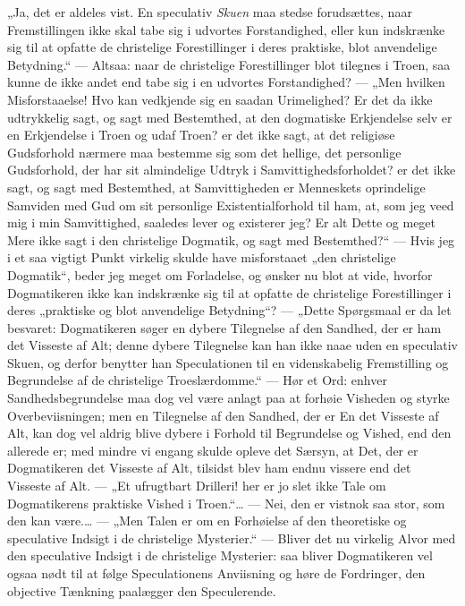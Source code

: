 „Ja, det er aldeles vist. En speculativ \emph{Skuen} maa stedse
forudsættes, naar Fremstillingen ikke skal tabe sig i udvortes
Forstandighed, eller kun indskrænke sig til at opfatte de
christelige Forestillinger i deres praktiske, blot anvendelige
Betydning.“ --- Altsaa: naar de christelige Forestillinger blot
tilegnes i Troen, saa kunne de ikke andet end tabe sig i en
udvortes Forstandighed?
 --- „Men hvilken Misforstaaelse! Hvo kan vedkjende sig en saadan
Urimelighed? Er det da ikke udtrykkelig sagt, og sagt med
Bestemthed, at den dogmatiske Erkjendelse selv er en Erkjendelse i
Troen og udaf Troen? er det ikke sagt, at det religiøse
Gudsforhold nærmere maa bestemme sig som det hellige, det
personlige Gudsforhold, der har sit almindelige Udtryk i
Samvittighedsforholdet? er det ikke sagt, og sagt med Bestemthed,
at Samvittigheden er Menneskets oprindelige Samviden med Gud om
sit personlige Existentialforhold til ham, at, som jeg veed mig i
min Samvittighed, saaledes lever og existerer jeg? Er alt Dette og
meget Mere ikke sagt i den christelige Dogmatik, og sagt med
Bestemthed?“ --- Hvis jeg i et saa vigtigt Punkt virkelig skulde
have misforstaaet „den christelige Dogmatik“, beder jeg meget om
Forladelse, og ønsker nu blot at vide, hvorfor Dogmatikeren ikke
kan indskrænke sig til at opfatte de christelige Forestillinger i
deres „praktiske og blot anvendelige Betydning“? --- „Dette
Spørgsmaal er da let besvaret: Dogmatikeren søger en dybere
Tilegnelse af den Sandhed, der er ham det Visseste af Alt; denne
dybere Tilegnelse kan han ikke naae uden en speculativ Skuen, og
derfor benytter han Speculationen til en videnskabelig
Fremstilling og Begrundelse af de christelige Troeslærdomme.“ ---
Hør et Ord: enhver Sandhedsbegrundelse maa dog vel være anlagt paa
at forhøie Visheden og styrke Overbeviisningen; men en Tilegnelse
af den Sandhed, der er En det Visseste af Alt, kan dog vel aldrig
blive
 dybere i Forhold til Begrundelse og Vished, end den allerede er;
med mindre vi engang skulde opleve det Særsyn, at Det, der er
Dogmatikeren det Visseste af Alt, tilsidst blev ham endnu vissere
end det Visseste af Alt. --- „Et ufrugtbart Drilleri! her er jo
slet ikke Tale om Dogmatikerens praktiske Vished i
Troen.“\ldots{} --- Nei, den er vistnok saa stor, som den kan
være.\ldots{} --- „Men Talen er om en Forhøielse af den
theoretiske og speculative Indsigt i de christelige Mysterier.“
--- Bliver det nu virkelig Alvor med den speculative Indsigt i de
christelige Mysterier: saa bliver Dogmatikeren vel ogsaa nødt til
at følge Speculationens Anviisning og høre de Fordringer, den
objective Tænkning paalægger den Speculerende.

